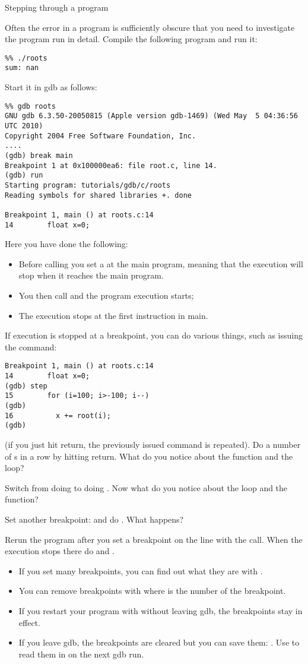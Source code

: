 
 {Stepping through a program}

Often the error in a program is sufficiently obscure that you need to
investigate the program run in detail. Compile the following program
%
%
and run it:
\begin{verbatim}
%% ./roots
sum: nan
\end{verbatim}
Start it in gdb as follows:
\begin{verbatim}
%% gdb roots
GNU gdb 6.3.50-20050815 (Apple version gdb-1469) (Wed May  5 04:36:56 UTC 2010)
Copyright 2004 Free Software Foundation, Inc.
....
(gdb) break main
Breakpoint 1 at 0x100000ea6: file root.c, line 14.
(gdb) run
Starting program: tutorials/gdb/c/roots
Reading symbols for shared libraries +. done

Breakpoint 1, main () at roots.c:14
14        float x=0;
\end{verbatim}
Here you have done the following:
\begin{itemize}
\item Before calling  you set a  at the
  main program, meaning that the execution will stop when it reaches
  the main program.
\item You then call  and the program execution starts;
\item The execution stops at the first instruction in main.
\end{itemize}
If execution is stopped at a breakpoint, you can do various things,
such as issuing the  command:
\begin{verbatim}
Breakpoint 1, main () at roots.c:14
14        float x=0;
(gdb) step
15        for (i=100; i>-100; i--)
(gdb) 
16          x += root(i);
(gdb) 
\end{verbatim}
(if you just hit return, the previously issued command is
repeated). Do a number of s in a row by hitting return. What
do you notice about the function and the loop?

Switch from doing  to doing . Now what do you notice
about the loop and the function? 

Set another breakpoint:  and do . What happens?

Rerun the program after you set a breakpoint on the line with the
 call. When the execution stops there do  and
.

\begin{itemize}
\item If you set many breakpoints, you can find out what they are with
  . 
\item You can remove breakpoints with  where  is the
  number of the breakpoint.
\item If you restart your program with  without leaving gdb,
  the breakpoints stay in effect.
\item If you leave gdb, the breakpoints are cleared but you can save
  them: . Use  to read
  them in on the next gdb run.
\end{itemize}

